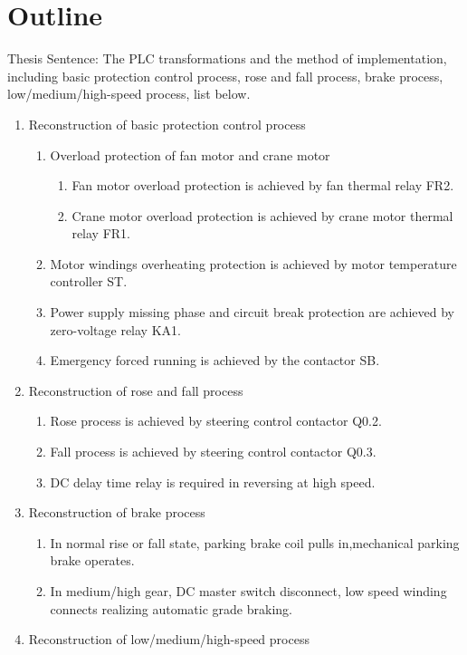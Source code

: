 \documentclass[a4paper,10.5pt]{article}
\begin{document}
\section*{Outline}
Thesis Sentence: The PLC transformations and the method of implementation, including basic protection control process, rose and fall process, brake process, low/medium/high-speed process, list below.
\begin{enumerate}
\item Reconstruction of basic protection control process	
	\begin{enumerate}
\item Overload protection of fan motor and crane motor
		\begin{enumerate}
\item Fan motor overload protection is achieved  by fan thermal relay FR2.
\item Crane motor overload protection is achieved  by crane motor thermal relay FR1.
		\end{enumerate}
\item Motor windings overheating protection is achieved by  motor temperature controller ST.
\item Power supply missing phase and circuit break protection are achieved by  zero-voltage relay KA1.
\item Emergency forced running is achieved by the contactor SB.
	\end{enumerate}
\item Reconstruction of rose and fall process
	\begin{enumerate}
\item Rose process  is achieved by steering control contactor Q0.2.
\item Fall process is  achieved by steering control contactor Q0.3.
\item DC delay time relay is required in reversing at high speed.
	\end{enumerate}
\item Reconstruction of brake process
	\begin{enumerate} 
\item In normal rise or fall state, parking brake   coil pulls in,mechanical parking brake operates.
\item In medium/high gear, DC master switch disconnect, low speed winding connects realizing automatic grade braking.
	\end{enumerate} 
\item Reconstruction of low/medium/high-speed process
	\begin{enumerate}

\end{enumerate}
\end{enumerate}
\end{document}

